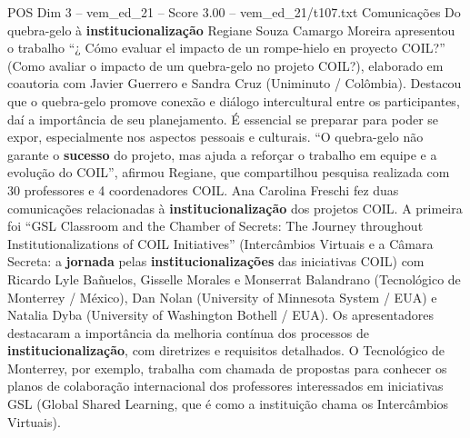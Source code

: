\begin{textsample}{POS Dim 3 – vem\_ed\_21 – Score 3.00 – vem\_ed\_21/t107.txt}  \label{ex:f3_pos_109}
Comunicações Do quebra-gelo à \textbf{institucionalização} Regiane Souza Camargo Moreira apresentou o trabalho “¿ Cómo evaluar el impacto de un rompe-hielo en proyecto COIL?” (Como avaliar o impacto de um quebra-gelo no projeto COIL?), elaborado em coautoria com Javier Guerrero e Sandra Cruz (Uniminuto / Colômbia).
Destacou que o quebra-gelo promove conexão e diálogo intercultural entre os participantes, daí a importância de seu planejamento.
É essencial se preparar para poder se expor, especialmente nos aspectos pessoais e culturais. “O quebra-gelo não garante o \textbf{sucesso} do projeto, mas ajuda a reforçar o trabalho em equipe e a evolução do COIL”, afirmou Regiane, que compartilhou pesquisa realizada com 30 professores e 4 coordenadores COIL.
Ana Carolina Freschi fez duas comunicações relacionadas à \textbf{institucionalização} dos projetos COIL.
A primeira foi “GSL Classroom and the Chamber of Secrets: The Journey throughout Institutionalizations of COIL Initiatives” (Intercâmbios Virtuais e a Câmara Secreta: a \textbf{jornada} pelas \textbf{institucionalizações} das iniciativas COIL) com Ricardo Lyle Bañuelos, Gisselle Morales e Monserrat Balandrano (Tecnológico de Monterrey / México), Dan Nolan (University of Minnesota System / EUA) e Natalia Dyba (University of Washington Bothell / EUA).
Os apresentadores destacaram a importância da melhoria contínua dos processos de \textbf{institucionalização}, com diretrizes e requisitos detalhados.
O Tecnológico de Monterrey, por exemplo, trabalha com chamada de propostas para conhecer os planos de colaboração internacional dos professores interessados em iniciativas GSL (Global Shared Learning, que é como a instituição chama os Intercâmbios Virtuais).

\end{textsample}
